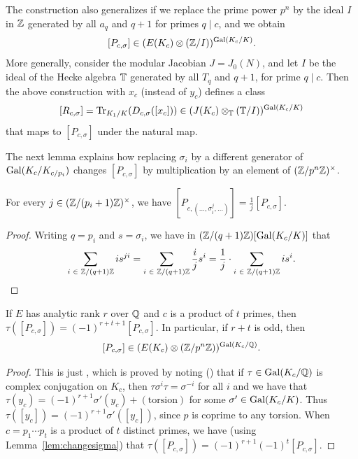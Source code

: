 \documentclass{article} \usepackage[active]{srcltx}
\begin{document}
\begin{remark}
  The construction also generalizes if we replace the prime power
  $p^n$ by the ideal $I$ in $\mathbb{Z}$ generated by all $a_{q}$ and $q+1$ for
  primes $q\mid c$, and we obtain 
$$
  [P_{c,\sigma}] \in (E(K_c) \otimes (\mathbb{Z}/I))^{\operatorname{Gal}(K_c/K)}.
$$
 More generally, consider the modular Jacobian $J=J_0(N)$, and
  let $I$ be the ideal of the Hecke algebra $\mathbb{T}$ generated by all
  $T_q$ and $q+1$, for prime $q\mid c$.
  Then the above construction with
  $x_c$ (instead of $y_c$) defines a class
$$
[R_{c,\sigma}] = \operatorname{Tr}_{K_1/K}(D_{c,\sigma}([x_c])) \in (J(K_c) \otimes_{\mathbb{T}} (\mathbb{T}/I))^{\operatorname{Gal}(K_c/K)}
$$
that maps to $[P_{c,\sigma}]$ under the natural map.  
\end{remark}

The next lemma explains how replacing $\sigma_i$ by a different
generator of $\operatorname{Gal}(K_c/K_{c/p_i})$ changes $[P_{c,\sigma}]$ by
multiplication by an element of $(\mathbb{Z}/p^n\mathbb{Z})^{\times}$.
\begin{lemma}\label{lem:changesigma} For 
every $j\in (\mathbb{Z}/(p_i+1)\mathbb{Z})^{\times}$,
we have $[P_{c,(\ldots, \sigma_i^j, \ldots)}]= \frac{1}{j} [P_{c,\sigma}]$.
\end{lemma}
\begin{proof}
Writing $q=p_i$ and $s=\sigma_i$, we have in $(\mathbb{Z}/(q+1)\mathbb{Z})[\operatorname{Gal}(K_c/K)]$ that
$$
\sum_{i\,\,\in\,\, \mathbb{Z}/(q+1)\mathbb{Z}} i s^{ji}
= \sum_{i\,\,\in\,\, \mathbb{Z}/(q+1)\mathbb{Z}} \frac{i}{j} s^{i} = 
\frac{1}{j} \cdot \sum_{i\,\,\in\,\, \mathbb{Z}/(q+1)\mathbb{Z}} i s^{i}.
$$
\end{proof}

\begin{lemma}\label{lem:pcsigma}
  If $E$ has analytic rank $r$ over $\mathbb{Q}$ and $c$
is a product of $t$ primes, then 
$\tau([P_{c,\sigma}]) = (-1)^{r+t+1} [P_{c,\sigma}]$.
In particular, if $r+t$ is odd, then 
$$
[P_{c,\sigma}]
  \in (E(K_c)\otimes (\mathbb{Z}/p^n\mathbb{Z}))^{\operatorname{Gal}(K_c/\mathbb{Q})}.
$$
\end{lemma}
\begin{proof} 
  This is just \cite[Prop.~5.4(1)]{gross:kolyvagin}, which is proved
  by noting (\cite[Prop.~5.3]{gross:kolyvagin}) that if
  $\tau\in\operatorname{Gal}(K_c/\mathbb{Q})$ is complex conjugation on $K_c$, then
  $\tau\sigma^i\tau = \sigma^{-i}$ for all $i$ and we have that
  $\tau(y_c) = (-1)^{r+1}\sigma'(y_c) + (\text{torsion})$ for some
  $\sigma' \in \operatorname{Gal}(K_c/K)$.  Thus $\tau([y_c]) =
  (-1)^{r+1}\sigma'([y_c])$, since $p$ is coprime to any torsion.
  When $c=p_1\cdots p_t$ is a product of $t$ distinct primes, we have
  (using Lemma~\ref{lem:changesigma}) that
  $
    \tau([P_{c,\sigma}]) = (-1)^{r+1} (-1)^t [P_{c,\sigma}].
  $
\end{proof}
\end{document}
